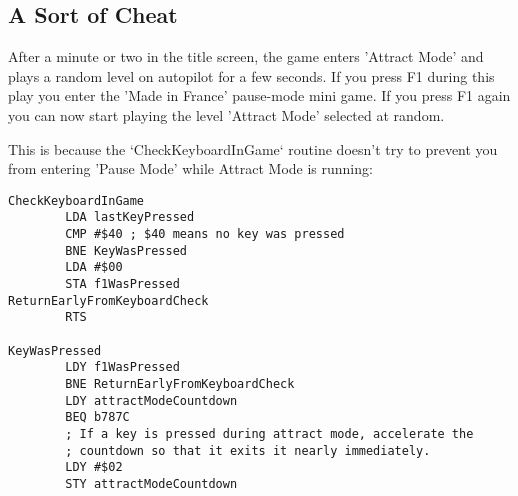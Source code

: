 \subsection{A Sort of Cheat}

After a minute or two in the title screen, the game enters 'Attract Mode' and
plays a random level on autopilot for a few seconds. If you press F1 during
this play you enter the 'Made in France' pause-mode mini game. If you press F1
again you can now start playing the level 'Attract Mode' selected at random.

This is because the `CheckKeyboardInGame` routine doesn't try to prevent you
from entering 'Pause Mode' while Attract Mode is running:

\begin{lstlisting}[caption=Fixing the reappearing enemy bug]
CheckKeyboardInGame
        LDA lastKeyPressed
        CMP #$40 ; $40 means no key was pressed
        BNE KeyWasPressed
        LDA #$00
        STA f1WasPressed
ReturnEarlyFromKeyboardCheck   
        RTS

KeyWasPressed   
        LDY f1WasPressed
        BNE ReturnEarlyFromKeyboardCheck
        LDY attractModeCountdown
        BEQ b787C
        ; If a key is pressed during attract mode, accelerate the
        ; countdown so that it exits it nearly immediately.
        LDY #$02
        STY attractModeCountdown
\end{lstlisting}

